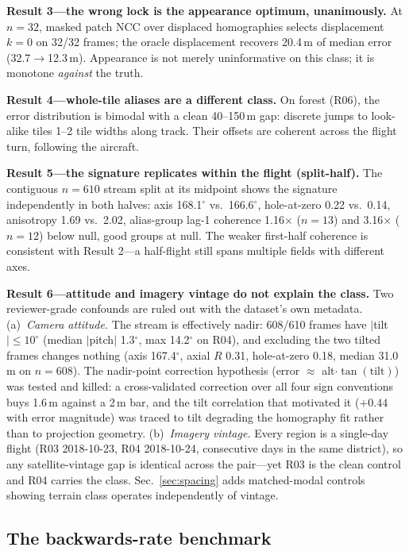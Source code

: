 \documentclass[journal]{IEEEtran}
\begin{document}
\textbf{Result 3---the wrong lock is the appearance optimum, unanimously.} At $n=32$, masked patch NCC over displaced homographies selects displacement $k=0$ on 32/32 frames; the oracle displacement recovers 20.4\,m of median error (32.7$\to$12.3\,m). Appearance is not merely uninformative on this class; it is monotone \emph{against} the truth.

\textbf{Result 4---whole-tile aliases are a different class.} On forest (R06), the error distribution is bimodal with a clean 40--150\,m gap: discrete jumps to look-alike tiles 1--2 tile widths along track. Their offsets are coherent across the flight turn, following the aircraft.

\textbf{Result 5---the signature replicates within the flight (split-half).} The contiguous $n=610$ stream split at its midpoint shows the signature independently in both halves: axis 168.1$^{\circ}$ vs.\ 166.6$^{\circ}$, hole-at-zero 0.22 vs.\ 0.14, anisotropy 1.69 vs.\ 2.02, alias-group lag-1 coherence 1.16$\times$ ($n=13$) and 3.16$\times$ ($n=12$) below null, good groups at null. The weaker first-half coherence is consistent with Result 2---a half-flight still spans multiple fields with different axes.

\textbf{Result 6---attitude and imagery vintage do not explain the class.} Two reviewer-grade confounds are ruled out with the dataset's own metadata. (a)~\emph{Camera attitude.} The stream is effectively nadir: 608/610 frames have $|$tilt$| \leq 10^{\circ}$ (median $|$pitch$|$ 1.3$^{\circ}$, max 14.2$^{\circ}$ on R04), and excluding the two tilted frames changes nothing (axis 167.4$^{\circ}$, axial $R$ 0.31, hole-at-zero 0.18, median 31.0\,m on $n=608$). The nadir-point correction hypothesis (error $\approx$ alt$\cdot\tan(\mathrm{tilt})$) was tested and killed: a cross-validated correction over all four sign conventions buys 1.6\,m against a 2\,m bar, and the tilt correlation that motivated it ($+0.44$ with error magnitude) was traced to tilt degrading the homography fit rather than to projection geometry. (b)~\emph{Imagery vintage.} Every region is a single-day flight (R03 2018-10-23, R04 2018-10-24, consecutive days in the same district), so any satellite-vintage gap is identical across the pair---yet R03 is the clean control and R04 carries the class. Sec.~\ref{sec:spacing} adds matched-modal controls showing terrain class operates independently of vintage.

\subsection{The backwards-rate benchmark}
\label{sec:bench}
\end{document}
